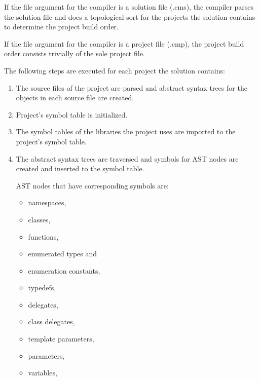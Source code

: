 \documentclass[oneside, a4paper, 11pt]{article}
\begin{document}
If the file argument for the compiler is a solution file (.cms),
the compiler parses the solution file and does a
topological sort for the projects the solution contains
to determine the project build order.

If the file argument for the compiler is a project file (.cmp),
the project build order consists trivially of the sole project file.

The following steps are executed for each project the solution contains:

\begin{enumerate}

\item
The source files of the project are parsed and abstract syntax trees for the
objects in each source file are created.

\item
Project's symbol table is initialized.

\item
The symbol tables of the libraries the project uses are imported to the project's symbol table.

\item
The abstract syntax trees are traversed and symbols for AST nodes are created and
inserted to the symbol table.

AST nodes that have corresponding symbols are:

\begin{itemize}
\item
namespaces,

\item
classes,

\item
functions,

\item
enumerated types and

\item
enumeration constants,

\item
typedefs,

\item
delegates,

\item
class delegates,

\item
template parameters,

\item
parameters,

\item
variables,


\end{itemize}
\end{enumerate}
\end{document}
